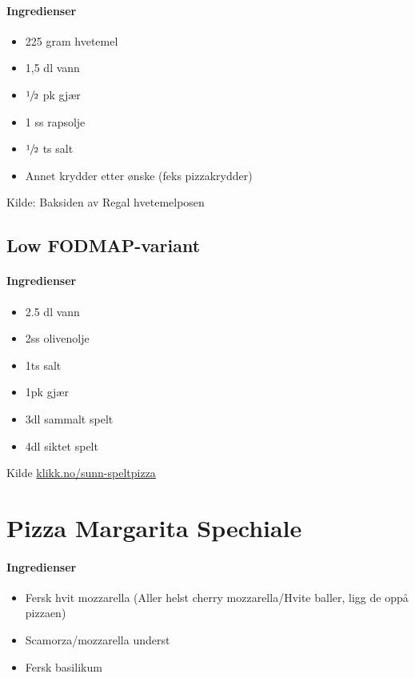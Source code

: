 \documentclass[12pt,a4paper]{book}
\begin{document}
\paragraph{Ingredienser}
\begin{itemize}[noitemsep]
	\item 225 gram hvetemel
	\item 1,5 dl vann
	\item $\sfrac{1}{2}$ pk gjær
	\item 1 ss rapsolje
	\item $\sfrac{1}{2}$ ts salt
	\item Annet krydder etter ønske (feks pizzakrydder)
\end{itemize}



Kilde: Baksiden av Regal hvetemelposen

\subsection{Low FODMAP-variant}

\paragraph{Ingredienser}
\begin{itemize}[noitemsep]
	\item 2.5 dl vann
	\item 2ss olivenolje
	\item 1ts salt
	\item 1pk gjær
	\item 3dl sammalt spelt
	\item 4dl siktet spelt
\end{itemize}



Kilde \href{http://oppskrift.klikk.no/sunn-speltpizza/2795/f}{klikk.no/sunn-speltpizza}
\clearpage{}
\clearpage{}\section{﻿Pizza Margarita Spechiale}


\paragraph{Ingredienser}
\begin{itemize}[noitemsep]
	\item Fersk hvit mozzarella (Aller helst cherry mozzarella/Hvite baller, ligg de oppå pizzaen)
	\item Scamorza/mozzarella underst
	\item Fersk basilikum
\end{itemize}
\end{document}
